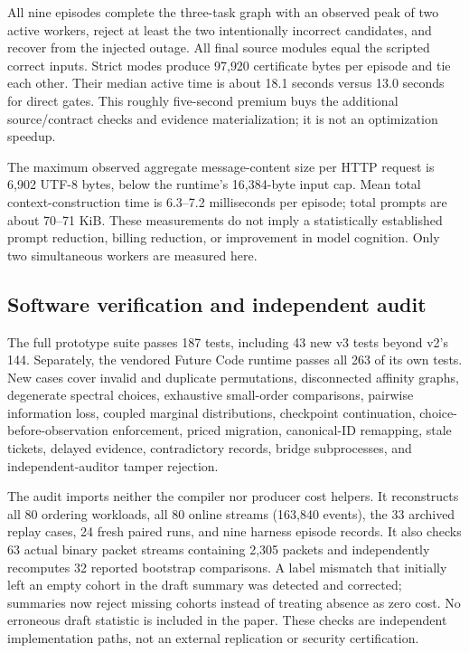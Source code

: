 All nine episodes complete the three-task graph with an observed peak of two active workers, reject at least the two intentionally incorrect candidates, and recover from the injected outage. All final source modules equal the scripted correct inputs. Strict modes produce 97,920 certificate bytes per episode and tie each other. Their median active time is about 18.1 seconds versus 13.0 seconds for direct gates. This roughly five-second premium buys the additional source/contract checks and evidence materialization; it is not an optimization speedup.

The maximum observed aggregate message-content size per HTTP request is 6,902 UTF-8 bytes, below the runtime's 16,384-byte input cap. Mean total context-construction time is 6.3--7.2 milliseconds per episode; total prompts are about 70--71 KiB. These measurements do not imply a statistically established prompt reduction, billing reduction, or improvement in model cognition. Only two simultaneous workers are measured here.

\subsection{Software verification and independent audit}
The full prototype suite passes 187 tests, including 43 new v3 tests beyond v2's 144. Separately, the vendored Future Code runtime passes all 263 of its own tests. New cases cover invalid and duplicate permutations, disconnected affinity graphs, degenerate spectral choices, exhaustive small-order comparisons, pairwise information loss, coupled marginal distributions, checkpoint continuation, choice-before-observation enforcement, priced migration, canonical-ID remapping, stale tickets, delayed evidence, contradictory records, bridge subprocesses, and independent-auditor tamper rejection.

The audit imports neither the compiler nor producer cost helpers. It reconstructs all 80 ordering workloads, all 80 online streams (163,840 events), the 33 archived replay cases, 24 fresh paired runs, and nine harness episode records. It also checks 63 actual binary packet streams containing 2,305 packets and independently recomputes 32 reported bootstrap comparisons. A label mismatch that initially left an empty cohort in the draft summary was detected and corrected; summaries now reject missing cohorts instead of treating absence as zero cost. No erroneous draft statistic is included in the paper. These checks are independent implementation paths, not an external replication or security certification.
